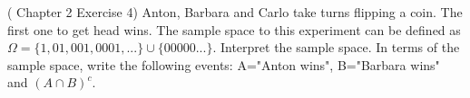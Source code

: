 \begin{ExerciseList}
%
\Exercise 
\label{e:game}(\cite{Ross} Chapter 2 Exercise 4)
Anton, Barbara  and Carlo take turns flipping a coin. The first one to get head wins. The sample space to this experiment can be defined as $\Omega=\{1,01,001,0001,...\}\cup\{00000...\}$.
\Question Interpret the sample space.
\Question In terms of the sample space, write the following events: A="Anton wins", B="Barbara wins" and $(A\cap B)^c$.

%
%
\end{ExerciseList}
